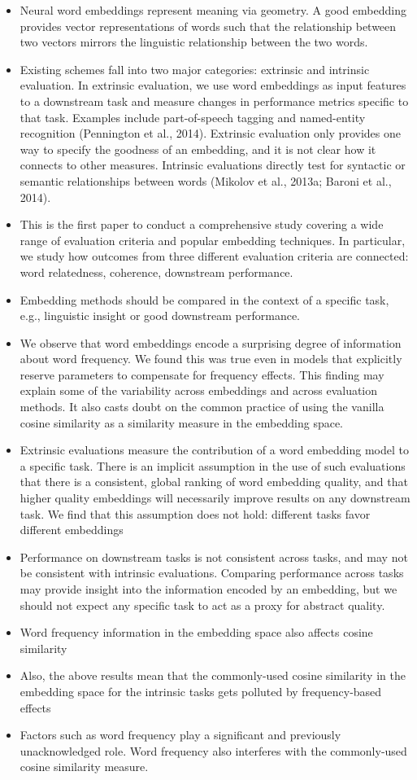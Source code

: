 \documentclass[../../Thesis.tex]{subfiles}
\begin{document}
\begin{itemize}
\item{Neural word embeddings represent meaning via
geometry. A good embedding provides vector representations
of words such that the relationship between
two vectors mirrors the linguistic relationship
between the two words.}
\item{Existing schemes fall into two major categories: extrinsic and intrinsic evaluation. In extrinsic evaluation, we use word embeddings as input features to a downstream task and measure changes in performance metrics specific to that task. Examples include part-of-speech tagging and named-entity recognition (Pennington et al., 2014). Extrinsic evaluation only provides one way to specify the goodness of an embedding, and it is not clear how it connects to other measures. Intrinsic evaluations directly test for syntactic or semantic relationships between words (Mikolov et al., 2013a; Baroni et al., 2014).}
\item{This is the first paper to conduct a comprehensive study covering a wide range of evaluation criteria and popular embedding techniques. In particular, we study how outcomes from three different evaluation criteria are connected: word relatedness, coherence, downstream performance.}
\item{Embedding methods should be compared in the context of a specific task, e.g., linguistic insight or good downstream performance.}
\item{We observe that word embeddings encode a surprising degree of information about word frequency. We found this was true even in models that explicitly reserve parameters to compensate for frequency effects. This finding may explain some of the variability across embeddings and across evaluation methods. It also casts doubt on the common practice of using the vanilla cosine similarity as a similarity measure in the embedding space.}
\item{Extrinsic evaluations measure the contribution of a word embedding model to a specific task. There is an implicit assumption in the use of such evaluations that there is a consistent, global ranking of word embedding quality, and that higher quality embeddings will necessarily improve results on any downstream task. We find that this assumption does not hold: different tasks favor different embeddings}
\item{Performance on downstream tasks is not consistent across tasks, and may not be consistent with intrinsic evaluations. Comparing performance across tasks may provide insight into the information encoded by an embedding, but we should not expect any specific task to act as a proxy for abstract quality.}
\item{Word frequency information in the embedding space also affects cosine similarity}
\item{ Also, the above results mean that the commonly-used cosine similarity in the embedding space for the intrinsic tasks gets polluted by frequency-based effects}
\item{Factors such as word frequency
play a significant and previously unacknowledged role. Word frequency also interferes with the commonly-used cosine similarity measure.}
\end{itemize}
\end{document}
